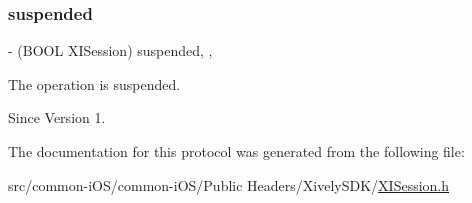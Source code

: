 \subsubsection{\texorpdfstring{suspended}{suspended}}
{\footnotesize\ttfamily -\/ (B\+O\+OL X\+I\+Session) suspended\hspace{0.3cm}{\ttfamily [read]}, {\ttfamily [nonatomic]}, {\ttfamily [assign]}}



The operation is suspended. 

\begin{DoxySince}{Since}
Version 1. 
\end{DoxySince}


The documentation for this protocol was generated from the following file\+:\begin{DoxyCompactItemize}
\item 
src/common-\/i\+O\+S/common-\/i\+O\+S/\+Public Headers/\+Xively\+S\+D\+K/\hyperlink{_x_i_session_8h}{X\+I\+Session.\+h}\end{DoxyCompactItemize}
